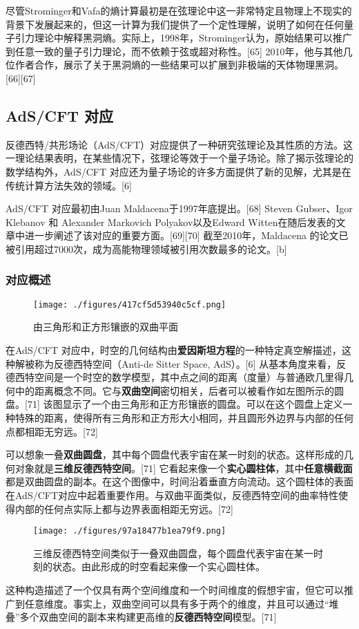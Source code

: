 尽管Strominger和Vafa的熵计算最初是在弦理论中这一非常特定且物理上不现实的背景下发展起来的，但这一计算为我们提供了一个定性理解，说明了如何在任何量子引力理论中解释黑洞熵。实际上，1998年，Strominger认为，原始结果可以推广到任意一致的量子引力理论，而不依赖于弦或超对称性。[65] 2010年，他与其他几位作者合作，展示了关于黑洞熵的一些结果可以扩展到非极端的天体物理黑洞。[66][67]
\subsection{AdS/CFT 对应}
反德西特/共形场论（AdS/CFT）对应提供了一种研究弦理论及其性质的方法。这一理论结果表明，在某些情况下，弦理论等效于一个量子场论。除了揭示弦理论的数学结构外，AdS/CFT 对应还为量子场论的许多方面提供了新的见解，尤其是在传统计算方法失效的领域。[6]  

AdS/CFT 对应最初由Juan Maldacena于1997年底提出。[68] Steven Gubser、Igor Klebanov 和 Alexander Markovich Polyakov以及Edward Witten在随后发表的文章中进一步阐述了该对应的重要方面。[69][70] 截至2010年，Maldacena 的论文已被引用超过7000次，成为高能物理领域被引用次数最多的论文。[b]
\subsubsection{对应概述}
\begin{figure}[ht]
\centering
\texttt{[image: ./figures/417cf5d53940c5cf.png]}
\caption{由三角形和正方形镶嵌的双曲平面} \label{fig_String_8}
\end{figure}
在AdS/CFT 对应中，时空的几何结构由\textbf{爱因斯坦方程}的一种特定真空解描述，这种解被称为反德西特空间（Anti-de Sitter Space, AdS）。[6] 从基本角度来看，反德西特空间是一个时空的数学模型，其中点之间的距离（度量）与普通欧几里得几何中的距离概念不同。它与\textbf{双曲空间}密切相关，后者可以被看作如左图所示的圆盘。[71] 该图显示了一个由三角形和正方形镶嵌的圆盘。可以在这个圆盘上定义一种特殊的距离，使得所有三角形和正方形大小相同，并且圆形外边界与内部的任何点都相距无穷远。[72]  

可以想象一叠\textbf{双曲圆盘}，其中每个圆盘代表宇宙在某一时刻的状态。这样形成的几何对象就是\textbf{三维反德西特空间}。[71] 它看起来像一个\textbf{实心圆柱体}，其中\textbf{任意横截面}都是双曲圆盘的副本。在这个图像中，时间沿着垂直方向流动。这个圆柱体的表面在AdS/CFT对应中起着重要作用。与双曲平面类似，反德西特空间的曲率特性使得内部的任何点实际上都与边界表面相距无穷远。[72]
\begin{figure}[ht]
\centering
\texttt{[image: ./figures/97a18477b1ea79f9.png]}
\caption{三维反德西特空间类似于一叠双曲圆盘，每个圆盘代表宇宙在某一时刻的状态。由此形成的时空看起来像一个实心圆柱体。} \label{fig_String_9}
\end{figure}
这种构造描述了一个仅具有两个空间维度和一个时间维度的假想宇宙，但它可以推广到任意维度。事实上，双曲空间可以具有多于两个的维度，并且可以通过“堆叠”多个双曲空间的副本来构建更高维的\textbf{反德西特空间}模型。[71]

